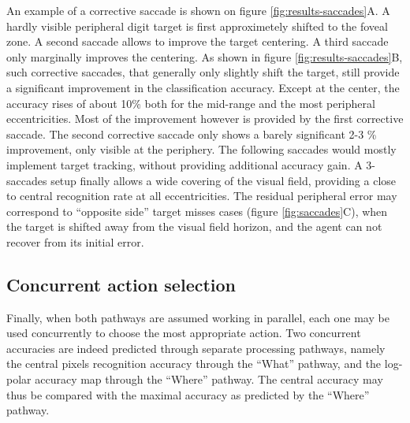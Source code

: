 An example of a corrective saccade is shown on figure \ref{fig:results-saccades}A. A hardly visible peripheral digit target is first approximetely shifted to the foveal zone. A second saccade allows to improve the target centering. A third saccade only marginally improves the centering.
As shown in figure  \ref{fig:results-saccades}B, such corrective saccades, that generally only slightly shift the target, still provide a significant improvement in the classification accuracy. Except at the center, the accuracy rises of about 10\% both for the mid-range and the most peripheral eccentricities. Most of the improvement however is provided by the first corrective saccade. The second corrective saccade only shows a barely significant 2-3 \% improvement, only visible at the periphery. The following saccades would mostly implement target tracking, without providing additional accuracy gain. A 3-saccades setup finally allows a wide covering of the visual field, providing a close to central  recognition rate at all eccentricities. The residual peripheral error may correspond to ``opposite side'' target misses cases (figure \ref{fig:saccades}C), when the target is shifted away from the visual field horizon, and the agent can not recover from its initial error.

\subsection*{Concurrent action selection}



Finally, when both pathways are assumed working in parallel, each one may be used concurrently to choose the most appropriate action. Two concurrent accuracies are indeed  predicted through separate processing pathways, namely the central pixels recognition accuracy through the ``What'' pathway, and the log-polar accuracy map through the ``Where'' pathway. The central accuracy may thus be compared with the maximal accuracy as predicted by the ``Where'' pathway.

